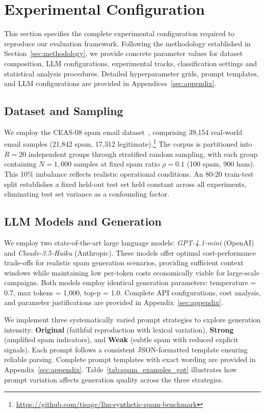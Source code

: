 \section{Experimental Configuration}
\label{sec:experiment}

This section specifies the complete experimental configuration required to reproduce our evaluation framework. Following the methodology established in Section~\ref{sec:methodology}, we provide concrete parameter values for dataset composition, LLM configurations, experimental tracks, classification settings and statistical analysis procedures. Detailed hyperparameter grids, prompt templates, and LLM configurations are provided in Appendices~\ref{sec:appendix}.

\subsection{Dataset and Sampling}
We employ the CEAS-08 spam email dataset~\cite{champa2024curated}, comprising 39,154 real-world email samples (21,842 spam, 17,312 legitimate).\footnote{\url{https://github.com/tisage/llm-synthetic-spam-benchmark}}
The corpus is partitioned into $R = 20$ independent groups through stratified random sampling, with each group containing $N = 1{,}000$ samples at fixed spam ratio $\rho = 0.1$ (100 spam, 900 ham). This 10\% imbalance reflects realistic operational conditions. An 80-20 train-test split establishes a fixed held-out test set held constant across all experiments, eliminating test set variance as a confounding factor.

\subsection{LLM Models and Generation}

We employ two state-of-the-art large language models: \textit{GPT-4.1-mini} (OpenAI) and \textit{Claude-3.5-Haiku} (Anthropic). These models offer optimal cost-performance trade-offs for realistic spam generation scenarios, providing sufficient context windows while maintaining low per-token costs economically viable for large-scale campaigns. Both models employ identical generation parameters: temperature = 0.7, max tokens = 1,000, top-p = 1.0. Complete API configurations, cost analysis, and parameter justifications are provided in Appendix~\ref{sec:appendix}.

We implement three systematically varied prompt strategies to explore generation intensity: \textbf{Original} (faithful reproduction with lexical variation), \textbf{Strong} (amplified spam indicators), and \textbf{Weak} (subtle spam with reduced explicit signals). Each prompt follows a consistent JSON-formatted template ensuring reliable parsing. Complete prompt templates with exact wording are provided in Appendix~\ref{sec:appendix}. Table~\ref{tab:spam_examples_gpt} illustrates how prompt variation affects generation quality across the three strategies.


